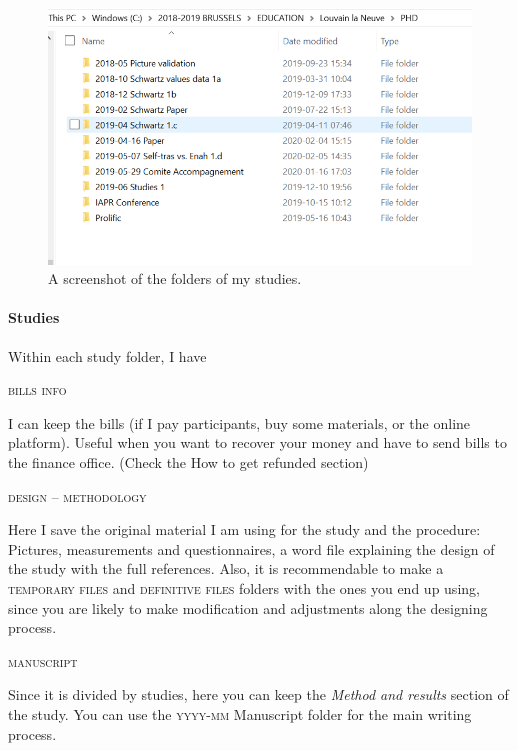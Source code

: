 \documentclass{article}
\begin{document}
\begin{figure}
\centering
\includegraphics[width = \textwidth]{images/folders.png}
\caption{A screenshot of the folders of my studies.}
\label{fig: folders}
\end{figure}

\paragraph{Studies}
\label{parag: studies}
Within each study folder, I have 
\begin{center}
    \textsc{bills info}
\end{center}

I can keep the bills (if I pay participants, buy some materials, or the online platform). Useful when you want to recover your money and have to send bills to the finance office. (Check the How to get refunded section)
\begin{center}
    \textsc{design – methodology}
\end{center}

Here I save the original material I am using for the study and the procedure: Pictures, measurements and questionnaires, a word file explaining the design of the study with the full references. Also, it is recommendable to make a \textsc{temporary files} and \textsc{definitive files} folders with the ones you end up using, since you are likely to make modification and adjustments along the designing process. 
\begin{center}
    \textsc{manuscript}
\end{center}

Since it is divided by studies, here you can keep the \emph{Method and results} section of the study. You can use the \textsc{yyyy-mm} Manuscript folder for the main writing process.
\end{document}
